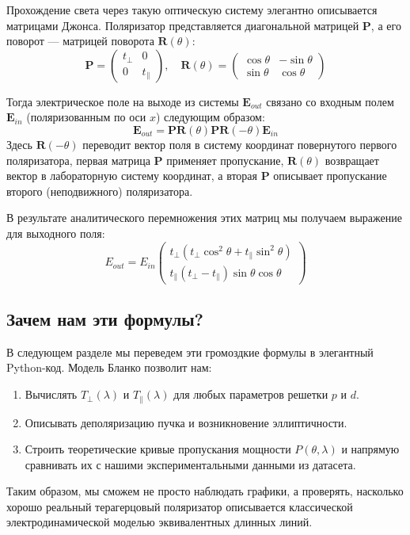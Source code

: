 
Прохождение света через такую оптическую систему элегантно описывается матрицами Джонса. Поляризатор представляется диагональной матрицей $\mathbf{P}$, а его поворот — матрицей поворота $\mathbf{R}(\theta)$:
\begin{equation}
\mathbf{P} = \begin{pmatrix} t_\perp & 0 \\ 0 & t_\parallel \end{pmatrix}, \quad \mathbf{R}(\theta) = \begin{pmatrix} \cos\theta & -\sin\theta \\ \sin\theta & \cos\theta \end{pmatrix}
\end{equation}


Тогда электрическое поле на выходе из системы $\mathbf{E}_{out}$ связано со входным полем $\mathbf{E}_{in}$ (поляризованным по оси $x$) следующим образом:
\begin{equation}
\mathbf{E}_{out} = \mathbf{P} \mathbf{R}(\theta) \mathbf{P} \mathbf{R}(-\theta) \mathbf{E}_{in}
\end{equation}
Здесь $\mathbf{R}(-\theta)$ переводит вектор поля в систему координат повернутого первого поляризатора, первая матрица $\mathbf{P}$ применяет пропускание, $\mathbf{R}(\theta)$ возвращает вектор в лабораторную систему координат, а вторая $\mathbf{P}$ описывает пропускание второго (неподвижного) поляризатора.

В результате аналитического перемножения этих матриц мы получаем выражение для выходного поля:
\begin{equation}
E_{out} = E_{in} \begin{pmatrix} t_\perp(t_\perp \cos^2\theta + t_\parallel \sin^2\theta) \\ t_\parallel(t_\perp - t_\parallel)\sin\theta\cos\theta \end{pmatrix}
\end{equation}

\subsection{Зачем нам эти формулы?}
В следующем разделе мы переведем эти громоздкие формулы в элегантный Python-код. Модель Бланко позволит нам:
\begin{enumerate}
    \item Вычислять $T_\perp(\lambda)$ и $T_\parallel(\lambda)$ для любых параметров решетки $p$ и $d$.
    \item Описывать деполяризацию пучка и возникновение эллиптичности.
    \item Строить теоретические кривые пропускания мощности $P(\theta, \lambda)$ и напрямую сравнивать их с нашими экспериментальными данными из датасета.
\end{enumerate}

Таким образом, мы сможем не просто наблюдать графики, а проверять, насколько хорошо реальный терагерцовый поляризатор описывается классической электродинамической моделью эквивалентных длинных линий.